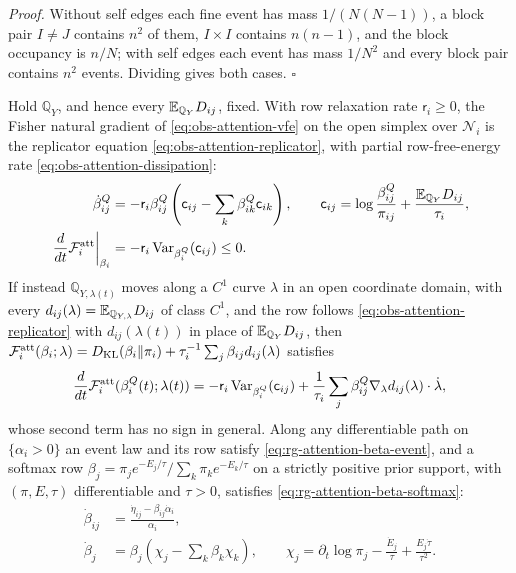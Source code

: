 \noindent\emph{Proof.}
Without self edges each fine event has mass \(1/(N(N-1))\), a block pair
\(I\ne J\) contains \(n^2\) of them, \(I\times I\) contains \(n(n-1)\), and the
block occupancy is \(n/N\); with self edges each event has mass \(1/N^2\) and
every block pair contains \(n^2\) events. Dividing gives both cases.
\(\square\)

Hold \(\mathbb Q_Y\), and hence every \(\mathbb E_{\mathbb Q_Y}D_{ij}\), fixed. With
row relaxation rate \(\mathsf r_i\geq0\), the Fisher natural gradient of
\eqref{eq:obs-attention-vfe} on the open simplex over \(\mathcal N_i\) is the
replicator equation \eqref{eq:obs-attention-replicator}, with partial
row-free-energy rate \eqref{eq:obs-attention-dissipation}:
\begin{align}
\dot\beta^Q_{ij}
&=-\mathsf r_i\beta^Q_{ij}
\left(\mathsf c_{ij}-\sum_k\beta^Q_{ik}\mathsf c_{ik}\right),
\qquad
\mathsf c_{ij}=\log\frac{\beta^Q_{ij}}{\pi_{ij}}
+\frac{\mathbb E_{\mathbb Q_Y}D_{ij}}{\tau_i},
\label{eq:obs-attention-replicator}\\
\left.\frac{d}{dt}\mathcal F_i^{\rm att}\right|_{\beta_i}
&=-\mathsf r_i\operatorname{Var}_{\beta^Q_i}(\mathsf c_{ij})\leq0.
\label{eq:obs-attention-dissipation}
\end{align}
If instead \(\mathbb Q_{Y,\lambda(t)}\) moves along a \(C^1\) curve \(\lambda\) in
an open coordinate domain, with every
\(d_{ij}(\lambda)=\mathbb E_{\mathbb Q_{Y,\lambda}}D_{ij}\) of class \(C^1\), and the
row follows \eqref{eq:obs-attention-replicator} with \(d_{ij}(\lambda(t))\) in
place of \(\mathbb E_{\mathbb Q_Y}D_{ij}\), then
\(\mathcal F_i^{\rm att}(\beta_i;\lambda)
=D_{\mathrm{KL}}(\beta_i\Vert\pi_i)+\tau_i^{-1}\sum_j\beta_{ij}d_{ij}(\lambda)\) satisfies
\begin{equation}
\frac{d}{dt}\mathcal F_i^{\rm att}(\beta_i^Q(t);\lambda(t))
=-\mathsf r_i\operatorname{Var}_{\beta^Q_i}(\mathsf c_{ij})
+\frac1{\tau_i}\sum_j\beta^Q_{ij}\nabla_\lambda d_{ij}(\lambda)\cdot\dot\lambda,
\label{eq:obs-attention-joint-rate}
\end{equation}
whose second term has no sign in general. Along any differentiable path on
\(\{\alpha_i>0\}\) an event law and its row satisfy
\eqref{eq:rg-attention-beta-event}, and a softmax row
\(\beta_j=\pi_je^{-E_j/\tau}/\sum_k\pi_ke^{-E_k/\tau}\) on a strictly positive
prior support, with \((\pi,E,\tau)\) differentiable and \(\tau>0\), satisfies
\eqref{eq:rg-attention-beta-softmax}:
\begin{align}
\dot\beta_{ij}
&=\frac{\dot\eta_{ij}-\beta_{ij}\dot\alpha_i}{\alpha_i},
\label{eq:rg-attention-beta-event}\\
\dot\beta_j&=\beta_j\left(\chi_j-\sum_k\beta_k\chi_k\right),
\qquad
\chi_j=\partial_t\log\pi_j-\frac{\dot E_j}{\tau}
+\frac{E_j\dot\tau}{\tau^2}.
\label{eq:rg-attention-beta-softmax}
\end{align}

